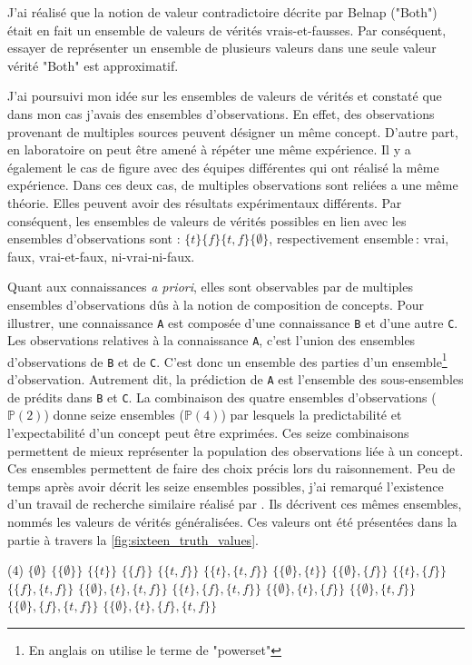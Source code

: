 \begin{refsegment}
J'ai réalisé que la notion de valeur contradictoire décrite par Belnap ("Both") était en fait un ensemble de valeurs de vérités vrais-et-fausses. Par conséquent, essayer de représenter un ensemble de plusieurs valeurs dans une seule valeur vérité "Both" est approximatif.

J'ai poursuivi mon idée sur les ensembles de valeurs de vérités et constaté que dans mon cas j'avais des ensembles d'observations. En effet, des observations provenant de multiples sources peuvent désigner un même concept. D'autre part, en laboratoire on peut être amené à répéter une même expérience. Il y a également le cas de figure avec des équipes différentes qui ont réalisé la même expérience. Dans ces deux cas, de multiples observations sont reliées a une même théorie. Elles peuvent avoir des résultats expérimentaux différents. Par conséquent, les ensembles de valeurs de vérités possibles en lien avec les ensembles d'observations sont : $\{t\} \{f\} \{t,f\} \{\emptyset\}$, respectivement ensemble : vrai, faux, vrai-et-faux, ni-vrai-ni-faux. 

Quant aux connaissances \textit{a priori}, elles sont observables par de multiples ensembles d'observations dûs à la notion de composition de concepts. Pour illustrer, une connaissance \texttt{A} est composée d'une connaissance \texttt{B} et d'une autre \texttt{C}. Les observations relatives à la connaissance \texttt{A}, c'est l'union des ensembles d'observations de \texttt{B} et de \texttt{C}. C'est donc un ensemble des parties d'un ensemble\footnote{En anglais on utilise le terme de "powerset"} d'observation. Autrement dit, la prédiction de \texttt{A} est l'ensemble des sous-ensembles de prédits dans \texttt{B} et \texttt{C}. La combinaison des quatre ensembles d'observations ($\mathbb{P}(2)$) donne seize ensembles ($\mathbb{P}(4)$) par lesquels la predictabilité et l'expectabilité d'un concept peut être exprimées. Ces seize combinaisons permettent de mieux représenter la population des observations liée à un concept. Ces ensembles permettent de faire des choix précis lors du raisonnement. Peu de temps après avoir décrit les seize ensembles possibles, j'ai remarqué l'existence d'un travail de recherche similaire réalisé par \citeauthor{shramko2005some}. Ils décrivent ces mêmes ensembles, nommés les valeurs de vérités généralisées. Ces valeurs ont été présentées dans la partie   à travers la \cref{fig:sixteen_truth_values}.

\begin{tasks}[counter-format = {tsk[1].},label-offset = {0.8em},label-format = {\bfseries}](4)
	\task $\{\emptyset\}$
	\task $\{\{\emptyset\}\}$
	\task $\{\{t\}\}$
	\task $\{\{f\}\}$
	\task $\{\{t,f\}\}$
	\task $\{\{t\},\{t,f\}\}$
	\task $\{\{\emptyset\},\{t\}\}$
	\task $\{\{\emptyset\},\{f\}\}$
	\task $\{\{t\},\{f\}\}$
	\task $\{\{f\},\{t,f\}\}$
	\task $\{\{\emptyset\},\{t\},\{t,f\}\}$
	\task $\{\{t\},\{f\},\{t,f\}\}$
	\task $\{\{\emptyset\},\{t\},\{f\}\}$
	\task $\{\{\emptyset\},\{t,f\}\}$
	\task $\{\{\emptyset\},\{f\},\{t,f\}\}$
	\task $\{\{\emptyset\},\{t\},\{f\},\{t,f\}\}$
\end{tasks}


\end{refsegment}
